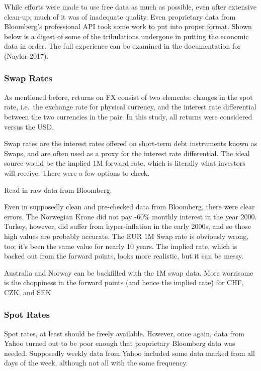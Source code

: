 \documentclass[]{article}
\begin{document}
While efforts were made to use free data as much as possible, even after
extensive clean-up, much of it was of inadequate quality. Even
proprietary data from Bloomberg's professional API took some work to put
into proper format. Shown below is a digest of some of the tribulations
undergone in putting the economic data in order. The full experience can
be examined in the documentation for (Naylor 2017).

\subsubsection{Swap Rates}\label{swap-rates}

As mentioned before, returns on FX consist of two elements: changes in
the spot rate, i.e.~the exchange rate for physical currency, and the
interest rate differential between the two currencies in the pair. In
this study, all returns were considered versus the USD.

Swap rates are the interest rates offered on short-term debt instruments
known as Swaps, and are often used as a proxy for the interest rate
differential. The ideal source would be the implied 1M forward rate,
which is literally what investors will receive. There were a few options
to check.

Read in raw data from Bloomberg.

Even in supposedly clean and pre-checked data from Bloomberg, there were
clear errors. The Norwegian Krone did not pay -60\% monthly interest in
the year 2000. Turkey, however, did suffer from hyper-inflation in the
early 2000s, and so those high values are probably accurate. The EUR 1M
Swap rate is obviously wrong, too; it's been the same value for nearly
10 years. The implied rate, which is backed out from the forward points,
looks more realistic, but it can be messy.

Australia and Norway can be backfilled with the 1M swap data. More
worrisome is the choppiness in the forward points (and hence the implied
rate) for CHF, CZK, and SEK.

\subsubsection{Spot Rates}\label{spot-rates}

Spot rates, at least should be freely available. However, once again,
data from Yahoo turned out to be poor enough that proprietary Bloomberg
data was needed. Supposedly weekly data from Yahoo included some data
marked from all days of the week, although not all with the same
frequency.
\end{document}
